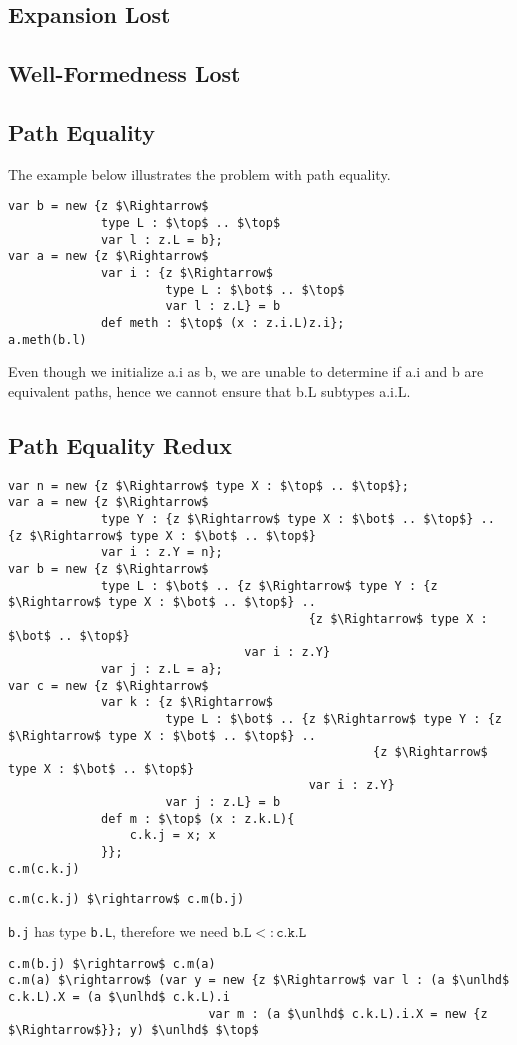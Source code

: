 \documentclass{llncs}
\begin{document}
\subsection{Expansion Lost}
\subsection{Well-Formedness Lost}

\subsection{Path Equality}
The example below illustrates the problem with path equality.
\begin{lstlisting}[mathescape, style=custom_lang]
var b = new {z $\Rightarrow$
             type L : $\top$ .. $\top$
             var l : z.L = b};
var a = new {z $\Rightarrow$
             var i : {z $\Rightarrow$
                      type L : $\bot$ .. $\top$
                      var l : z.L} = b
             def meth : $\top$ (x : z.i.L)z.i};
a.meth(b.l)
\end{lstlisting}
Even though we initialize a.i as b, we are unable to determine if
a.i and b are equivalent paths, hence we cannot ensure that b.L subtypes 
a.i.L.

\subsection{Path Equality Redux}
\begin{lstlisting}[mathescape, style=custom_lang]
var n = new {z $\Rightarrow$ type X : $\top$ .. $\top$};
var a = new {z $\Rightarrow$
             type Y : {z $\Rightarrow$ type X : $\bot$ .. $\top$} .. {z $\Rightarrow$ type X : $\bot$ .. $\top$}
             var i : z.Y = n};
var b = new {z $\Rightarrow$
             type L : $\bot$ .. {z $\Rightarrow$ type Y : {z $\Rightarrow$ type X : $\bot$ .. $\top$} .. 
                                          {z $\Rightarrow$ type X : $\bot$ .. $\top$}
                                 var i : z.Y}
             var j : z.L = a};
var c = new {z $\Rightarrow$
             var k : {z $\Rightarrow$
                      type L : $\bot$ .. {z $\Rightarrow$ type Y : {z $\Rightarrow$ type X : $\bot$ .. $\top$} .. 
                                                   {z $\Rightarrow$ type X : $\bot$ .. $\top$}
                                          var i : z.Y}
                      var j : z.L} = b
             def m : $\top$ (x : z.k.L){
                 c.k.j = x; x
             }};
c.m(c.k.j)
\end{lstlisting}
\begin{lstlisting}[mathescape, style=custom_lang]
c.m(c.k.j) $\rightarrow$ c.m(b.j)
\end{lstlisting} 
\texttt{b.j} has type \texttt{b.L}, therefore we need 
$\texttt{b.L} <: \texttt{c.k.L}$
\begin{lstlisting}[mathescape, style=custom_lang]
c.m(b.j) $\rightarrow$ c.m(a)
c.m(a) $\rightarrow$ (var y = new {z $\Rightarrow$ var l : (a $\unlhd$ c.k.L).X = (a $\unlhd$ c.k.L).i 
                            var m : (a $\unlhd$ c.k.L).i.X = new {z $\Rightarrow$}}; y) $\unlhd$ $\top$
\end{lstlisting}
\end{document}
